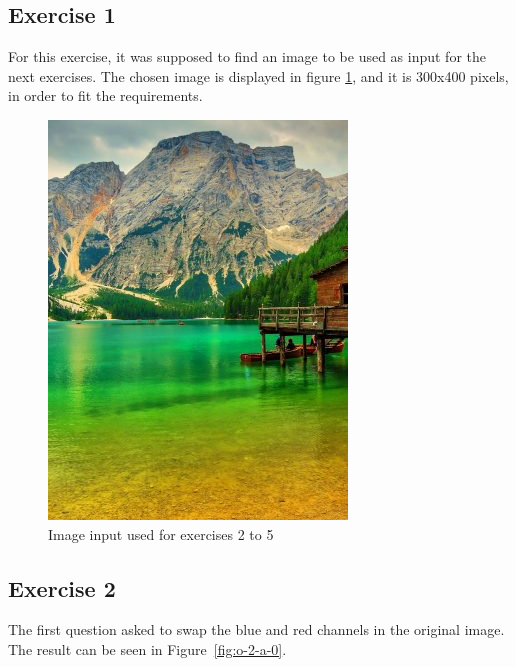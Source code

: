 \documentclass[]{IEEEtran}
\begin{document}
  \subsection{Exercise 1}
  For this exercise, it was supposed to find an image to be used as input for the next exercises. The chosen image is displayed in figure \ref{fig:i-1-0}, and it is 300x400 pixels, in order to fit the requirements.
  \begin{figure}[!h]
    \centering
    \includegraphics[width=0.8\hsize]{../input/i-1-0.jpg}
    \caption{Image input used for exercises 2 to 5}
    \label{fig:i-1-0}
  \end{figure}
  
  \subsection{Exercise 2}
  
  The first question asked to swap the blue and red channels in the original image. The result can be seen in Figure~\ref{fig:o-2-a-0}.
  
\end{document}
